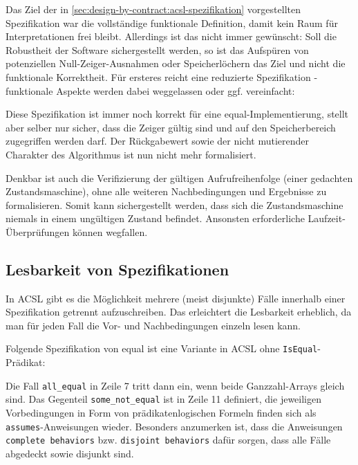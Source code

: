 Das Ziel der in \ref{sec:design-by-contract:acsl-spezifikation} vorgestellten Spezifikation war die
vollständige funktionale Definition, damit kein Raum für Interpretationen frei bleibt. Allerdings ist
das nicht immer gewünscht: Soll die Robustheit der Software sichergestellt werden, so ist das Aufspüren 
von potenziellen Null-Zeiger-Ausnahmen oder Speicherlöchern das Ziel und nicht die funktionale
Korrektheit. Für ersteres reicht eine reduzierte Spezifikation - funktionale Aspekte werden dabei 
weggelassen oder ggf. vereinfacht:


 
Diese Spezifikation ist immer noch korrekt für eine equal-Implementierung, stellt aber selber nur sicher,
dass die Zeiger gültig sind und auf den Speicherbereich zugegriffen werden darf. Der Rückgabewert sowie 
der nicht mutierender Charakter des Algorithmus ist nun nicht mehr formalisiert.

Denkbar ist auch die Verifizierung der gültigen Aufrufreihenfolge (einer gedachten Zustandsmaschine),
ohne alle weiteren Nachbedingungen und Ergebnisse zu formalisieren. Somit kann sichergestellt werden,
dass sich die Zustandsmaschine niemals in einem ungültigen Zustand befindet. Ansonsten erforderliche
Laufzeit-Überprüfungen können wegfallen.



\subsection{Lesbarkeit von Spezifikationen}
\label{sec:design-by-contract:behaviors}

In ACSL gibt es die Möglichkeit mehrere (meist disjunkte) Fälle innerhalb einer Spezifikation getrennt
aufzuschreiben. Das erleichtert die Lesbarkeit erheblich, da man für jeden Fall die Vor- und Nachbedingungen
einzeln lesen kann.

Folgende Spezifikation von equal ist eine Variante in ACSL ohne \lstinline{IsEqual}-Prädikat:



Die Fall \lstinline{all_equal} in Zeile 7 tritt dann ein, wenn beide Ganzzahl-Arrays gleich sind. Das Gegenteil
\lstinline{some_not_equal} ist in Zeile 11 definiert, die jeweiligen Vorbedingungen in Form von
prädikatenlogischen Formeln finden sich als \lstinline{assumes}-Anweisungen wieder. Besonders anzumerken ist,
dass die Anweisungen \lstinline{complete behaviors} bzw. \lstinline{disjoint behaviors} dafür sorgen, dass
alle Fälle abgedeckt sowie disjunkt sind.

